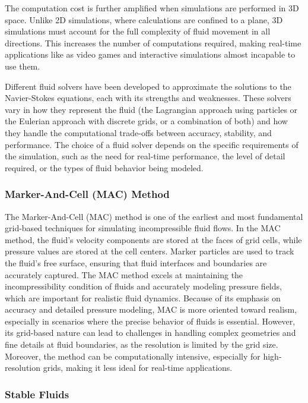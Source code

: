The computation cost is further amplified when simulations are performed in 3D space. Unlike 2D simulations, where calculations are confined to a plane, 3D simulations must account for the full complexity of fluid movement in all directions. This increases the number of computations required, making real-time applications like as video games and interactive simulations almost incapable to use them.

Different fluid solvers have been developed to approximate the solutions to the Navier-Stokes equations, each with its strengths and weaknesses. These solvers vary in how they represent the fluid (the Lagrangian approach using particles or the Eulerian approach with discrete grids, or a combination of both) and how they handle the computational trade-offs between accuracy, stability, and performance. The choice of a fluid solver depends on the specific requirements of the simulation, such as the need for real-time performance, the level of detail required, or the types of fluid behavior being modeled.

\subsubsection{Marker-And-Cell (MAC) Method}

The Marker-And-Cell (MAC) method is one of the earliest and most fundamental grid-based techniques for simulating incompressible fluid flows. In the MAC method, the fluid's velocity components are stored at the faces of grid cells, while pressure values are stored at the cell centers. Marker particles are used to track the fluid's free surface, ensuring that fluid interfaces and boundaries are accurately captured. The MAC method excels at maintaining the incompressibility condition of fluids and accurately modeling pressure fields, which are important for realistic fluid dynamics. Because of its emphasis on accuracy and detailed pressure modeling, MAC is more oriented toward realism, especially in scenarios where the precise behavior of fluids is essential. However, its grid-based nature can lead to challenges in handling complex geometries and fine details at fluid boundaries, as the resolution is limited by the grid size. Moreover, the method can be computationally intensive, especially for high-resolution grids, making it less ideal for real-time applications.

\subsubsection{Stable Fluids}

